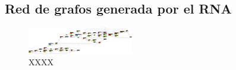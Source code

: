 \subsection{Red de grafos generada por el RNA}

 \lipsum[1]

\begin{figure}[H]
	\centering
	\includegraphics[angle = 90, width=0.41\textwidth]{Figuras/Graph_4}
	\centering\caption{XXXX}
\end{figure}

\lipsum[1]